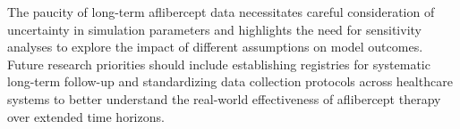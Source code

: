 The paucity of long-term aflibercept data necessitates careful consideration of uncertainty in simulation parameters and highlights the need for sensitivity analyses to explore the impact of different assumptions on model outcomes. Future research priorities should include establishing registries for systematic long-term follow-up and standardizing data collection protocols across healthcare systems to better understand the real-world effectiveness of aflibercept therapy over extended time horizons.